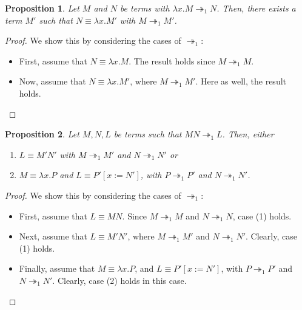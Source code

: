 \documentclass[a4paper, openany]{memoir}
\newtheorem{proposition}{Proposition}[section]
\theoremstyle{definition}
\begin{document}
    \begin{proposition}
        Let $M$ and $N$ be terms with $\lambda x.M \twoheadrightarrow_1 N$. Then, there exists a term $M'$ such that $N \equiv \lambda x.M'$ with $M \twoheadrightarrow_1 M'$.
    \end{proposition}
    \begin{proof}
        We show this by considering the cases of $\twoheadrightarrow_1$:
        \begin{itemize}
            \item First, assume that $N \equiv \lambda x.M$. The result holds since $M \twoheadrightarrow_1 M$.
            \item Now, assume that $N \equiv \lambda x.M'$, where $M \twoheadrightarrow_1 M'$. Here as well, the result holds.
        \end{itemize}
    \end{proof}

    \begin{proposition}
        Let $M, N, L$ be terms such that $MN \twoheadrightarrow_1 L$. Then, either
        \begin{enumerate}
            \item $L \equiv M' N'$ with $M \twoheadrightarrow_1 M'$ and $N \twoheadrightarrow_1 N'$ or
            \item $M \equiv \lambda x.P$ and $L \equiv P'[x := N']$, with $P \twoheadrightarrow_1 P'$ and $N \twoheadrightarrow_1 N'$.
        \end{enumerate}
    \end{proposition}
    \begin{proof}
        We show this by considering the cases of $\twoheadrightarrow_1$:
        \begin{itemize}
            \item First, assume that $L \equiv MN$. Since $M \twoheadrightarrow_1 M$ and $N \twoheadrightarrow_1 N$, case (1) holds.
            \item Next, assume that $L \equiv M'N'$, where $M \twoheadrightarrow_1 M'$ and $N \twoheadrightarrow_1 N'$. Clearly, case (1) holds.
            \item Finally, assume that $M \equiv \lambda x.P$, and $L \equiv P'[x := N']$, with $P \twoheadrightarrow_1 P'$ and $N \twoheadrightarrow_1 N'$. Clearly, case (2) holds in this case.
        \end{itemize}
    \end{proof}
\end{document}
